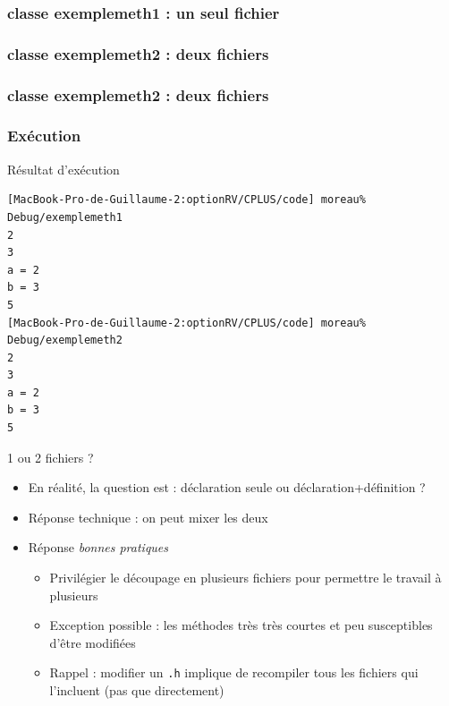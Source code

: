 \begin{frame}[fragile]
\frametitle{classe exemplemeth1 : un seul fichier}

\end{frame}

\begin{frame}[fragile]
\frametitle{classe exemplemeth2 : deux fichiers}

\end{frame}

\begin{frame}[fragile]
\frametitle{classe exemplemeth2 : deux fichiers}

\end{frame}

\begin{frame}[fragile]
\frametitle{Exécution}
\begin{block}{Résultat d'exécution}
{\tiny \begin{verbatim}
[MacBook-Pro-de-Guillaume-2:optionRV/CPLUS/code] moreau% Debug/exemplemeth1
2
3
a = 2
b = 3
5
[MacBook-Pro-de-Guillaume-2:optionRV/CPLUS/code] moreau% Debug/exemplemeth2
2
3
a = 2
b = 3
5
\end{verbatim}}
\end{block}
\end{frame}

\begin{frame}{1 ou 2 fichiers ?}
\begin{itemize}
\item En réalité, la question est : déclaration seule ou déclaration+définition ?
\item Réponse technique : on peut mixer les deux
\item Réponse \textit{bonnes pratiques}
\begin{itemize}
\item Privilégier le découpage en plusieurs fichiers pour permettre le travail à plusieurs
\item Exception possible : les méthodes très très courtes et peu susceptibles d'être modifiées
\item Rappel : modifier un \texttt{.h} implique de recompiler tous les fichiers qui l'incluent (pas que directement)
\end{itemize}
\end{itemize}
\end{frame}

